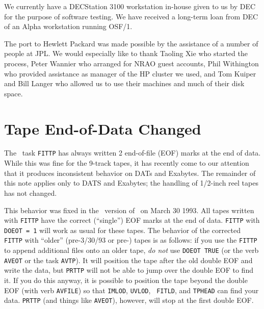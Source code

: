 We currently have a DECStation 3100 workstation in-house given to us
by DEC for the purpose of software testing.  We have received a
long-term loan from DEC of an Alpha workstation running OSF/1.

The port to Hewlett Packard was made possible by the assistance of a
number of people at \hbox{{JPL}}.  We would especially like to thank
Taoling Xie who started the process, Peter Wannier who arranged for
NRAO guest accounts, Phil Withington who provided assistance as
manager of the HP cluster we used, and Tom Kuiper and Bill Langer who
allowed us to use their machines and much of their disk space.

\section{Tape End-of-Data Changed}

The \AIPS\ task {\tt FITTP} has always written 2 end-of-file (EOF)
marks at the end of data.  While this was fine for the 9-track tapes,
it has recently come to our attention that it produces inconsistent
behavior on DATs and Exabytes.  The remainder of this note applies
only to DATS and Exabytes; the handling of 1/2-inch reel tapes has not
changed.

This behavior was fixed in the \RELEASENAME\ version of \AIPS\ on
March 30 1993.  All tapes written with {\tt FITTP} have the correct
(``single'') EOF marks at the end of data.  {\tt FITTP} with {\tt
DOEOT = 1} will work as usual for these tapes.  The behavior of the
corrected {\tt FITTP} with ``older'' (pre-3/30/93 or pre-\RELEASENAME)
tapes is as follows: if you use the {\tt FITTP} to append additional
files onto an older tape, {\it do not} use {\tt DOEOT TRUE} (or the
verb {\tt AVEOT} or the task \hbox{{\tt AVTP}}).  It will position the
tape after the old double EOF and write the data, but {\tt PRTTP} will
not be able to jump over the double EOF to find it.  If you do this
anyway, it is possible to position the tape beyond the double EOF
(with verb {\tt AVFILE}) so that {\tt IMLOD}, {\tt UVLOD}, {\tt
FITLD}, and {\tt TPHEAD} can find your data.  {\tt PRTTP} (and things
like {\tt AVEOT}), however, will stop at the first double
\hbox{{EOF}}.

